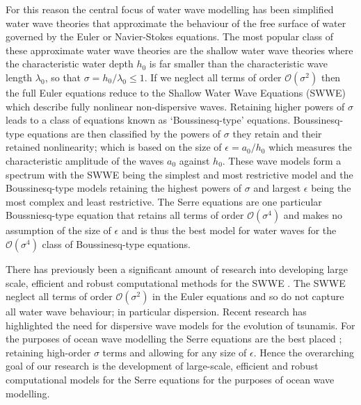 For this reason the central focus of water wave modelling has been simplified water wave theories that approximate the behaviour of the free surface of water governed by the Euler or Navier-Stokes equations. The most popular class of these approximate water wave theories are the shallow water wave theories where the characteristic water depth $h_0$ is far smaller than the characteristic wave length $\lambda_0$, so that $\sigma = h_0 / \lambda_0 \le 1$. If we neglect all terms of order $\mathcal{O}\left(\sigma ^2\right)$ then the full Euler equations reduce to the Shallow Water Wave Equations (SWWE) \cite{Bonneton-Lannes-2009-16601} which describe fully nonlinear non-dispersive waves. Retaining higher powers of $\sigma$ leads to a class of equations known as `Boussinesq-type' equations. Boussinesq-type equations are then classified by the powers of $\sigma$ they retain and their retained nonlinearity; which is based on the size of $\epsilon= a_0 / h_0$ which measures the characteristic amplitude of the waves $a_0$ against $h_0$. These wave models form a spectrum with the SWWE being the simplest and most restrictive model and the Boussinesq-type models retaining the highest powers of $\sigma$ and largest $\epsilon$ being the most complex and least restrictive. The Serre equations are one particular Boussniesq-type equation that retains all terms of order $\mathcal{O}\left(\sigma ^4\right)$ and makes no assumption of the size of $\epsilon$ \cite{Bonneton-Lannes-2009-16601} and is thus the best model for water waves for the $\mathcal{O}\left(\sigma ^4\right)$ class of Boussinesq-type equations. 

There has previously been a significant amount of research into developing large scale, efficient and robust computational methods for the SWWE \cite{ClawPack,Comcot,ANUGA}. The SWWE neglect all terms of order $\mathcal{O}\left(\sigma ^2\right)$ in the Euler equations and so do not capture all water wave behaviour; in particular dispersion. Recent research \cite{Grue-etal-2008-113,Kirby-etal-2013-39} has highlighted the need for dispersive wave models for the evolution of tsunamis. For the purposes of ocean wave modelling the Serre equations are the best placed \cite{Bonneton-Lannes-2009-16601}; retaining high-order $\sigma$ terms and allowing for any size of $\epsilon$. Hence the overarching goal of our research is the development of large-scale, efficient and robust computational models for the Serre equations for the purposes of ocean wave modelling.



